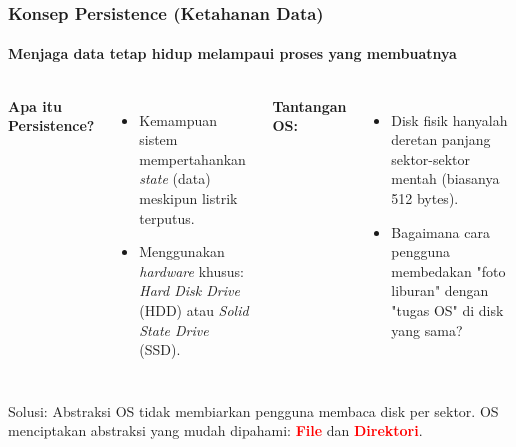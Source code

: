 \documentclass[t,aspectratio=169,xcolor=dvipsnames]{beamer}
\newcommand{\tem}[1]{\textbf{\textcolor{red}{#1}}}
\begin{document}
\begin{frame}
    \frametitle{Konsep Persistence (Ketahanan Data)}
    \framesubtitle{Menjaga data tetap hidup melampaui proses yang membuatnya}
    \small

    \begin{columns}[T]
        \textbf{Apa itu Persistence?}
        \begin{itemize}
            \item Kemampuan sistem mempertahankan \textit{state} (data) meskipun listrik terputus.
            \item Menggunakan \textit{hardware} khusus: \textit{Hard Disk Drive} (HDD) atau \textit{Solid State Drive} (SSD).
        \end{itemize}
        
        \textbf{Tantangan OS:}
        \begin{itemize}
            \item Disk fisik hanyalah deretan panjang sektor-sektor mentah (biasanya 512 bytes).
            \item Bagaimana cara pengguna membedakan "foto liburan" dengan "tugas OS" di disk yang sama?
        \end{itemize}
    \end{columns}

    \vspace{0.4cm}
    \begin{alertblock}{Solusi: Abstraksi}
        OS tidak membiarkan pengguna membaca disk per sektor. OS menciptakan abstraksi yang mudah dipahami: \tem{File} dan \tem{Direktori}.
    \end{alertblock}
\end{frame}
\end{document}
